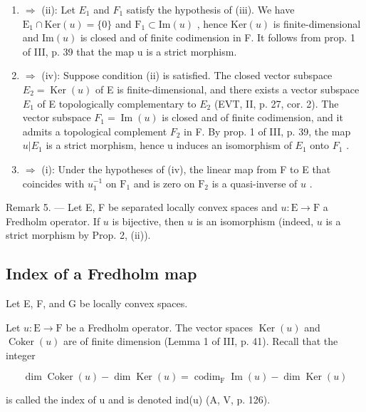 \begin{enumerate}
\def\labelenumi{(\roman{enumi})}
\setcounter{enumi}{2}
\item
  \(\Longrightarrow\) (ii): Let \(E_{1}\) and \(F_{1}\) satisfy the hypothesis of (iii). We have \(\mathrm{E}_{1}\cap\mathrm{Ker}(u)=\{0\}\) and \(\mathrm{F}_{1}\subset\mathrm{Im}(u)\) , hence \(\mathrm{Ker}(u)\) is finite-dimensional and \(\mathrm{Im}(u)\) is closed and of finite codimension in F. It follows from prop. 1 of III, p. 39 that the map u is a strict morphism.
\item
   \(\Longrightarrow\) (iv): Suppose condition (ii) is satisfied. The closed vector subspace \(E_{2} = \operatorname{Ker}(u)\) of E is finite-dimensional, and there exists a vector subspace \(E_{1}\) of E topologically complementary to \(E_{2}\) (EVT, II, p. 27, cor. 2). The vector subspace \(F_{1} = \operatorname{Im}(u)\) is closed and of finite codimension, and it admits a topological complement \(F_{2}\) in F. By prop. 1 of III, p. 39, the map \(u|E_{1}\) is a strict morphism, hence u induces an isomorphism of \(E_{1}\) onto \(F_{1}\) .
\item
   \(\Longrightarrow\) (i): Under the hypotheses of (iv), the linear map from F to E that coincides with \(u_1^{-1}\) on \(\mathrm{F}_1\) and is zero on \(\mathrm{F}_2\) is a quasi-inverse of \(u\) .
\end{enumerate}

Remark 5. --- Let E, F be separated locally convex spaces and \(u\colon\mathrm{E}\to\mathrm{F}\) a Fredholm operator. If \(u\) is bijective, then \(u\) is an isomorphism (indeed, \(u\) is a strict morphism by Prop. 2, (ii)).

\subsection{Index of a Fredholm map}

Let E, F, and G be locally convex spaces.

Let \(u \colon \mathrm{E} \to \mathrm{F}\) be a Fredholm operator. The vector spaces \(\operatorname{Ker}(u)\) and \(\operatorname{Coker}(u)\) are of finite dimension (Lemma 1 of III, p. 41). Recall that the integer

\[
\dim \operatorname{Coker} (u) - \dim \operatorname{Ker} (u) = \operatorname{codim} _ {\mathrm{F}} \operatorname{Im} (u) - \dim \operatorname{Ker} (u) \tag {1}
\]

is called the index of u and is denoted ind(u) (A, V, p. 126).

